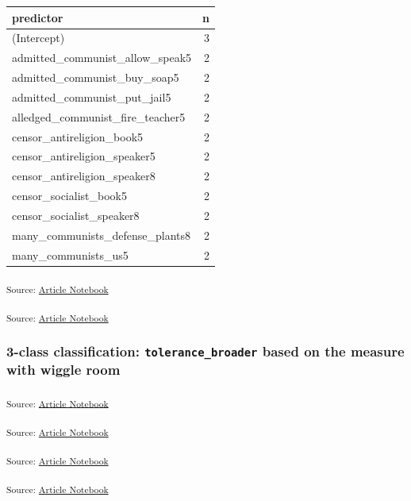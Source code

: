 \documentclass[
  letterpaper,
  DIV=11,
  numbers=noendperiod]{scrartcl}
\begin{document}
\begin{longtable}[]{@{}lr@{}}
\toprule\noalign{}
predictor & n \\
\midrule\noalign{}
\endhead
\bottomrule\noalign{}
\endlastfoot
(Intercept) & 3 \\
admitted\_communist\_allow\_speak5 & 2 \\
admitted\_communist\_buy\_soap5 & 2 \\
admitted\_communist\_put\_jail5 & 2 \\
alledged\_communist\_fire\_teacher5 & 2 \\
censor\_antireligion\_book5 & 2 \\
censor\_antireligion\_speaker5 & 2 \\
censor\_antireligion\_speaker8 & 2 \\
censor\_socialist\_book5 & 2 \\
censor\_socialist\_speaker8 & 2 \\
many\_communists\_defense\_plants8 & 2 \\
many\_communists\_us5 & 2 \\
\end{longtable}

\textsubscript{Source:
\href{https://h-christy.github.io/data-ethics-final/index.qmd.html}{Article
Notebook}}

\textsubscript{Source:
\href{https://h-christy.github.io/data-ethics-final/index.qmd.html}{Article
Notebook}}

\subsubsection{\texorpdfstring{3-class classification:
\texttt{tolerance\_broader} based on the measure with wiggle
room}{3-class classification: tolerance\_broader based on the measure with wiggle room}}\label{class-classification-tolerance_broader-based-on-the-measure-with-wiggle-room}

\textsubscript{Source:
\href{https://h-christy.github.io/data-ethics-final/index.qmd.html}{Article
Notebook}}

\textsubscript{Source:
\href{https://h-christy.github.io/data-ethics-final/index.qmd.html}{Article
Notebook}}

\textsubscript{Source:
\href{https://h-christy.github.io/data-ethics-final/index.qmd.html}{Article
Notebook}}

\textsubscript{Source:
\href{https://h-christy.github.io/data-ethics-final/index.qmd.html}{Article
Notebook}}
\end{document}
